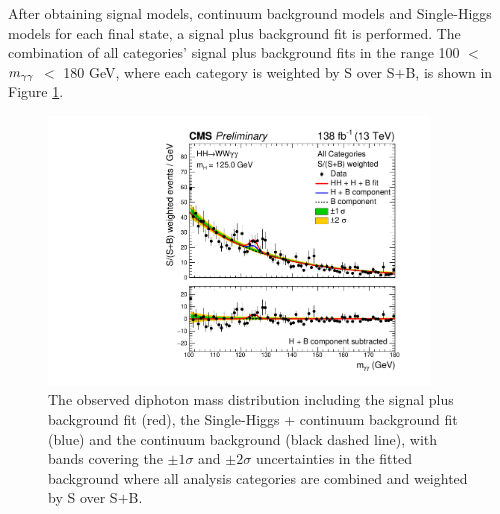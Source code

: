After obtaining signal models, continuum background models and Single-Higgs models for each final state, a signal plus background fit is performed.
The combination of all categories' signal plus background fits in the range 100 $<$ $m_{\gamma\gamma}$ $<$ 180 GeV, where each category is weighted by S over S$+$B, is shown in Figure \ref{fig:Run2SplusB}.

\begin{figure}[!htbp]
  \centering
  \includegraphics[width=0.9\textwidth]{Images/Results/All_combined_SplusB.pdf}
 \caption{The observed diphoton mass distribution including the signal plus background fit (red), the Single-Higgs + continuum background fit (blue) and the continuum background (black dashed line), 
 with bands covering the $\pm 1\sigma$ and $\pm 2\sigma$ uncertainties in the fitted background where all analysis categories are combined and weighted by S over S$+$B.}
  \label{fig:Run2SplusB}
\end{figure}
